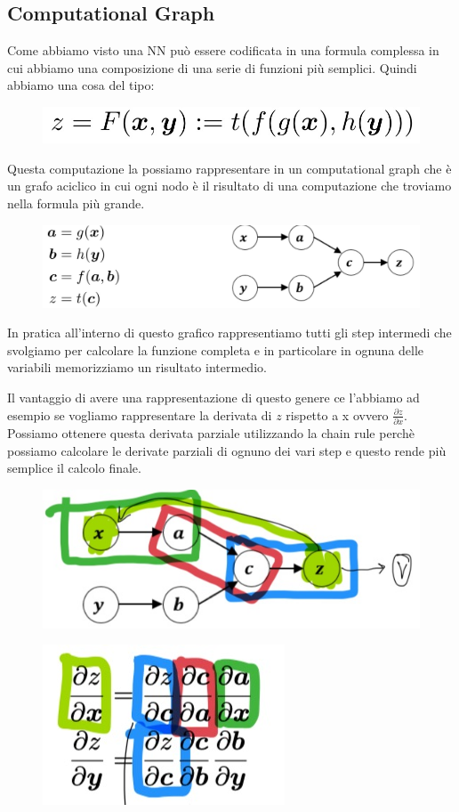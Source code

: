 \documentclass[14pt]{extreport}
\begin{document}
\subsection{Computational Graph}

Come abbiamo visto una NN può essere codificata in una formula complessa in cui abbiamo una composizione di una serie di funzioni più semplici. Quindi
abbiamo una cosa del tipo:
\begin{figure}[H]
	\centering
	\includegraphics[width=0.5\linewidth]{384.jpeg}
\end{figure}

Questa computazione la possiamo rappresentare in un computational graph che è un grafo aciclico in cui ogni nodo è il risultato di una computazione
che troviamo nella formula più grande.

\begin{figure}[H]
	\centering
	\includegraphics[width=0.5\linewidth]{385.jpeg}
\end{figure}

In pratica all'interno di questo grafico rappresentiamo tutti gli step intermedi che svolgiamo per calcolare la funzione completa e in particolare in
ognuna delle variabili memorizziamo un risultato intermedio.

Il vantaggio di avere una rappresentazione di questo genere ce l'abbiamo ad esempio se vogliamo rappresentare la derivata di $z$ rispetto a x ovvero
$\frac{\partial z}{\partial x}$. Possiamo ottenere questa derivata parziale utilizzando la chain rule perchè possiamo calcolare le derivate parziali
di ognuno dei vari step e questo rende più semplice il calcolo finale.
\begin{figure}[H]
	\centering
	\includegraphics[width=0.5\linewidth]{386.jpeg}
\end{figure}
\begin{figure}[H]
	\centering
	\includegraphics[width=0.2\linewidth]{387.jpeg}
\end{figure}
\end{document}
